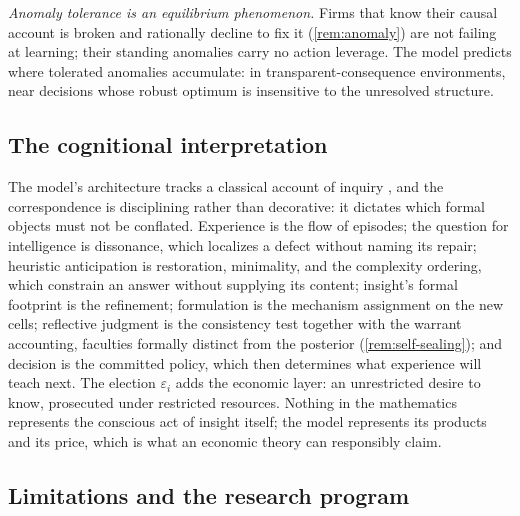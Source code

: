 \documentclass[11pt]{article}
\theoremstyle{definition}
\begin{document}
\emph{Anomaly tolerance is an equilibrium phenomenon.}  Firms that know
their causal account is broken and rationally decline to fix it
(\cref{rem:anomaly}) are not failing at learning; their standing anomalies
carry no action leverage.  The model predicts where tolerated anomalies
accumulate: in transparent-consequence environments, near decisions whose
robust optimum is insensitive to the unresolved structure.

\subsection{The cognitional interpretation}

The model's architecture tracks a classical account of inquiry
\citep{Lonergan1992,RyallWilkins2018}, and the correspondence is
disciplining rather than decorative: it dictates which formal objects must
not be conflated.  Experience is the flow of episodes; the question for
intelligence is dissonance, which localizes a defect without naming its
repair; heuristic anticipation is restoration, minimality, and the
complexity ordering, which constrain an answer without supplying its
content; insight's formal footprint is the refinement; formulation is the
mechanism assignment on the new cells; reflective judgment is the
consistency test together with the warrant accounting, faculties formally
distinct from the posterior (\cref{rem:self-sealing}); and decision is the
committed policy, which then determines what experience will teach next.
The election $\varepsilon_i$ adds the economic layer: an unrestricted desire
to know, prosecuted under restricted resources.  Nothing in the mathematics
represents the conscious act of insight itself; the model represents its
products and its price, which is what an economic theory can responsibly
claim.

\subsection{Limitations and the research program}
\end{document}
